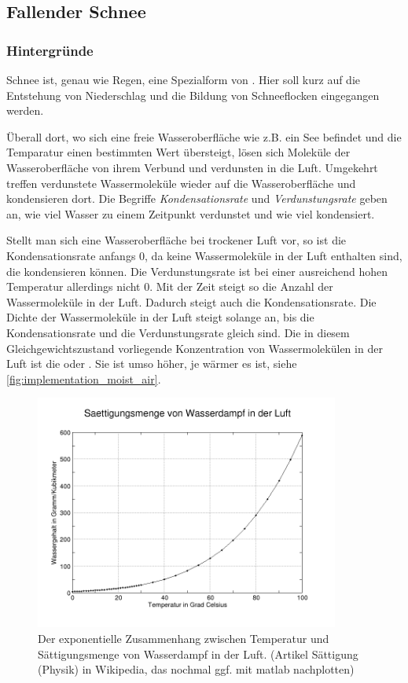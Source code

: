 \subsection{Fallender Schnee}

\subsubsection{Hintergründe}

Schnee ist, genau wie Regen, eine Spezialform von .
Hier soll kurz auf die Entstehung von Niederschlag und die Bildung von
Schneeflocken eingegangen werden\cite{wiki:Luftfeuchtigkeit}.

Überall dort, wo sich eine freie Wasseroberfläche wie z.B. ein See befindet und
die Temparatur einen bestimmten Wert übersteigt, lösen sich Moleküle der
Wasseroberfläche von ihrem Verbund und verdunsten in die Luft. Umgekehrt treffen
verdunstete Wassermoleküle wieder auf die Wasseroberfläche und kondensieren
dort. Die Begriffe \emph{Kondensationsrate} und
\emph{Verdunstungsrate} geben an, wie viel Wasser zu einem Zeitpunkt
verdunstet und wie viel kondensiert.

Stellt man sich eine Wasseroberfläche bei trockener Luft vor, so ist
die Kondensationsrate anfangs 0, da keine Wassermoleküle in der Luft
enthalten sind, die kondensieren können. Die Verdunstungsrate ist
bei einer ausreichend hohen Temperatur allerdings nicht 0. Mit der
Zeit steigt so die Anzahl der Wassermoleküle in der Luft. Dadurch
steigt auch die Kondensationsrate. Die Dichte der Wassermoleküle in
der Luft steigt solange an, bis die Kondensationsrate und die
Verdunstungsrate gleich sind. Die in diesem Gleichgewichtszustand
vorliegende Konzentration von Wassermolekülen in der Luft ist die
 oder . Sie ist umso höher, je wärmer es ist, siehe
\autoref{fig:implementation_moist_air}.

\begin{figure}[ht]
\centering
\includegraphics[width=10cm]{images/moist_air}
\caption{Der exponentielle Zusammenhang zwischen Temperatur und Sättigungsmenge von Wasserdampf in der Luft. (Artikel Sättigung (Physik) in Wikipedia, das nochmal ggf. mit matlab nachplotten)}
\label{fig:implementation_moist_air}
\end{figure}

